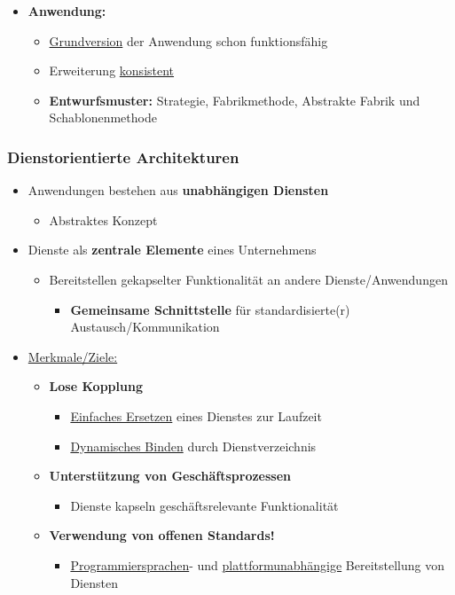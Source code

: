 \documentclass[parskip=full, 12pt]{scrartcl}
\begin{document}
				\begin{itemize}
					\item \textbf{Anwendung:}
					\begin{itemize}
						\item \underline{Grundversion} der Anwendung schon funktionsfähig
						\item Erweiterung \underline{konsistent}
						\item \textbf{Entwurfsmuster:} Strategie, Fabrikmethode, Abstrakte Fabrik und Schablonenmethode
					\end{itemize}
				\end{itemize}
	
			\subsubsection{Dienstorientierte Architekturen}
			
				\begin{itemize}
					\item Anwendungen bestehen aus \textbf{unabhängigen Diensten}
					\begin{itemize}
						\item Abstraktes Konzept
					\end{itemize}
					\item Dienste als \textbf{zentrale Elemente} eines Unternehmens
					\begin{itemize}
						\item Bereitstellen gekapselter Funktionalität an andere Dienste/Anwendungen
						\begin{itemize}
							\item \textbf{Gemeinsame Schnittstelle} für standardisierte(r) Austausch/Kommunikation
						\end{itemize}
					\end{itemize}
					\item \underline{Merkmale/Ziele:}
					\begin{itemize}
						\item \textbf{Lose Kopplung}
						\begin{itemize}
							\item \underline{Einfaches Ersetzen} eines Dienstes zur Laufzeit
							\item \underline{Dynamisches Binden} durch Dienstverzeichnis
						\end{itemize}
						\item \textbf{Unterstützung von Geschäftsprozessen}
						\begin{itemize}
							\item Dienste kapseln geschäftsrelevante Funktionalität
						\end{itemize}
						\item \textbf{Verwendung von offenen Standards!}
						\begin{itemize}
							\item \underline{Programmiersprachen}- und \underline{plattformunabhängige} Bereitstellung von Diensten
						\end{itemize}
					\end{itemize}
				\end{itemize}
	
\end{document}
